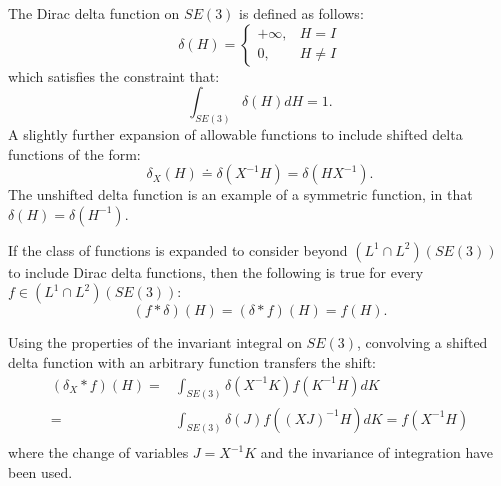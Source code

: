 \documentclass[twocolumn,10pt]{asme2ej}
\begin{document}
The Dirac delta function on $SE(3)$ is defined as follows:
\begin{equation}\label{equ2}
\delta{(H)}=
\left\{
\begin{array}{ll}
+\infty, & H=I \\
0, & H \neq I
\end{array}
\right.
\end{equation}
which satisfies the constraint that: 
\begin{equation}\label{equ3}
\int_{SE(3)}\delta{(H)}dH=1.
\end{equation}
A slightly further expansion of allowable functions to include shifted delta functions of the form:
\begin{equation}
\delta_X(H) \doteq \delta(X^{-1} H) = \delta( H X^{-1}).
\end{equation}
The unshifted delta function is an example of a symmetric function, in that $\delta(H) = \delta(H^{-1})$.

If the class of functions is expanded to consider beyond $(L^1 \cap L^2)(SE(3))$
to include Dirac delta functions, then the following is true for every $f \in (L^1 \cap L^2)(SE(3))$:
$$ (f * \delta)(H) = (\delta * f)(H) = f(H). $$

Using the properties of the invariant integral on $SE(3)$, convolving a shifted delta function with an arbitrary
function transfers the shift:
\begin{equation}
\begin{split}
(\delta_X * f)(H) =& \int_{SE(3)} \delta(X^{-1} K) f(K^{-1} H) dK \\
=& \int_{SE(3)} \delta(J) f((XJ)^{-1} H) dK = f(X^{-1} H) \\
\end{split}
\end{equation}
where the change of variables $J = X^{-1} K$ and the invariance of integration have been used.

\end{document}
